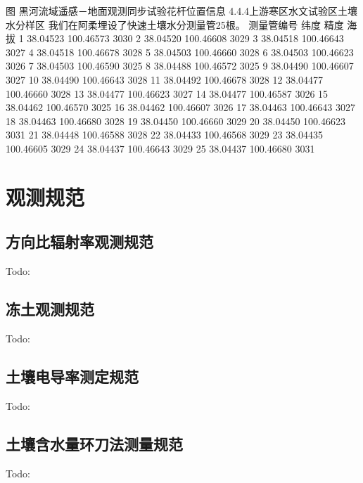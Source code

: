 \documentclass[letterpaper,10pt,english]{sphinxmanual}
\begin{document}
图 黑河流域遥感－地面观测同步试验花杆位置信息
4.4.4上游寒区水文试验区土壤水分样区
我们在阿柔埋设了快速土壤水分测量管25根。
测量管编号   纬度      精度      海拔
1       38.04523        100.46573       3030
2       38.04520        100.46608       3029
3       38.04518        100.46643       3027
4       38.04518        100.46678       3028
5       38.04503        100.46660       3028
6       38.04503        100.46623       3026
7       38.04503        100.46590       3025
8       38.04488        100.46572       3025
9       38.04490        100.46607       3027
10      38.04490        100.46643       3028
11      38.04492        100.46678       3028
12      38.04477        100.46660       3028
13      38.04477        100.46623       3027
14      38.04477        100.46587       3026
15      38.04462        100.46570       3025
16      38.04462        100.46607       3026
17      38.04463        100.46643       3027
18      38.04463        100.46680       3028
19      38.04450        100.46660       3029
20      38.04450        100.46623       3031
21      38.04448        100.46588       3028
22      38.04433        100.46568       3029
23      38.04435        100.46605       3029
24      38.04437        100.46643       3029
25      38.04437        100.46680       3031


\chapter{观测规范}
\label{observe_standard::doc}\label{observe_standard:observe-standard}\label{observe_standard:id1}

\section{方向比辐射率观测规范}
\label{observe_standard:id2}
Todo:


\section{冻土观测规范}
\label{observe_standard:id3}
Todo:


\section{土壤电导率测定规范}
\label{observe_standard:id4}
Todo:


\section{土壤含水量环刀法测量规范}
\label{observe_standard:id5}
Todo:
\end{document}
